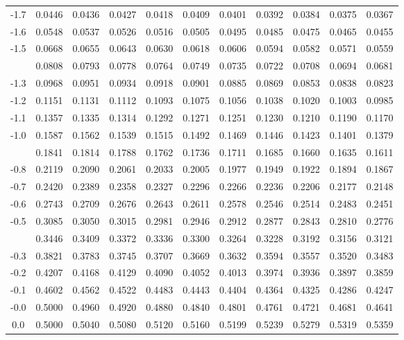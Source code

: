 \documentclass[12pt,a4paper]{article}
\begin{document}
\begin{enumerate}
\begin{center}
\begin{longtable}{ccccccccccc}
-1.7 & 0.0446 & 0.0436 & 0.0427 & 0.0418 & 0.0409 & 0.0401 & 0.0392 & 0.0384 & 0.0375 & 0.0367 \\
-1.6 & 0.0548 & 0.0537 & 0.0526 & 0.0516 & 0.0505 & 0.0495 & 0.0485 & 0.0475 & 0.0465 & 0.0455 \\
-1.5 & 0.0668 & 0.0655 & 0.0643 & 0.0630 & 0.0618 & 0.0606 & 0.0594 & 0.0582 & 0.0571 & 0.0559 \\
\addlinespace
-1.4 & 0.0808 & 0.0793 & 0.0778 & 0.0764 & 0.0749 & 0.0735 & 0.0722 & 0.0708 & 0.0694 & 0.0681 \\
-1.3 & 0.0968 & 0.0951 & 0.0934 & 0.0918 & 0.0901 & 0.0885 & 0.0869 & 0.0853 & 0.0838 & 0.0823 \\
-1.2 & 0.1151 & 0.1131 & 0.1112 & 0.1093 & 0.1075 & 0.1056 & 0.1038 & 0.1020 & 0.1003 & 0.0985 \\
-1.1 & 0.1357 & 0.1335 & 0.1314 & 0.1292 & 0.1271 & 0.1251 & 0.1230 & 0.1210 & 0.1190 & 0.1170 \\
-1.0 & 0.1587 & 0.1562 & 0.1539 & 0.1515 & 0.1492 & 0.1469 & 0.1446 & 0.1423 & 0.1401 & 0.1379 \\
\addlinespace
-0.9 & 0.1841 & 0.1814 & 0.1788 & 0.1762 & 0.1736 & 0.1711 & 0.1685 & 0.1660 & 0.1635 & 0.1611 \\
-0.8 & 0.2119 & 0.2090 & 0.2061 & 0.2033 & 0.2005 & 0.1977 & 0.1949 & 0.1922 & 0.1894 & 0.1867 \\
-0.7 & 0.2420 & 0.2389 & 0.2358 & 0.2327 & 0.2296 & 0.2266 & 0.2236 & 0.2206 & 0.2177 & 0.2148 \\
-0.6 & 0.2743 & 0.2709 & 0.2676 & 0.2643 & 0.2611 & 0.2578 & 0.2546 & 0.2514 & 0.2483 & 0.2451 \\
-0.5 & 0.3085 & 0.3050 & 0.3015 & 0.2981 & 0.2946 & 0.2912 & 0.2877 & 0.2843 & 0.2810 & 0.2776 \\
\addlinespace
-0.4 & 0.3446 & 0.3409 & 0.3372 & 0.3336 & 0.3300 & 0.3264 & 0.3228 & 0.3192 & 0.3156 & 0.3121 \\
-0.3 & 0.3821 & 0.3783 & 0.3745 & 0.3707 & 0.3669 & 0.3632 & 0.3594 & 0.3557 & 0.3520 & 0.3483 \\
-0.2 & 0.4207 & 0.4168 & 0.4129 & 0.4090 & 0.4052 & 0.4013 & 0.3974 & 0.3936 & 0.3897 & 0.3859 \\
-0.1 & 0.4602 & 0.4562 & 0.4522 & 0.4483 & 0.4443 & 0.4404 & 0.4364 & 0.4325 & 0.4286 & 0.4247 \\
-0.0 & 0.5000 & 0.4960 & 0.4920 & 0.4880 & 0.4840 & 0.4801 & 0.4761 & 0.4721 & 0.4681 & 0.4641 \\
\midrule
0.0 & 0.5000 & 0.5040 & 0.5080 & 0.5120 & 0.5160 & 0.5199 & 0.5239 & 0.5279 & 0.5319 & 0.5359 \\

\end{longtable}
\end{center}
\end{enumerate}
\end{document}
